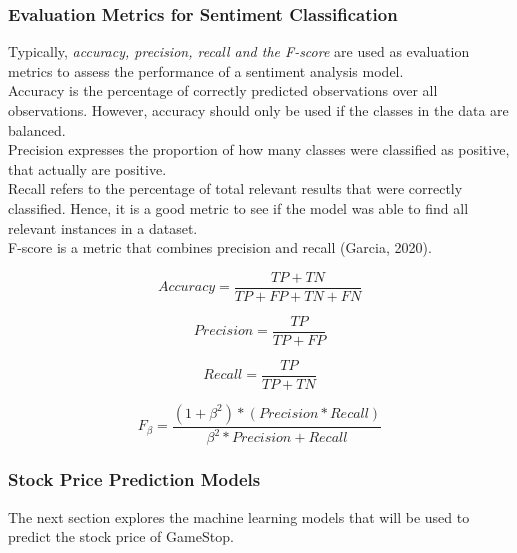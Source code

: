 \documentclass[11pt, a4paper]{article}
\begin{document}
\subsubsection{Evaluation Metrics for Sentiment Classification}
Typically, \emph{accuracy, precision, recall and the F-score} are used as evaluation metrics to assess the performance of a sentiment analysis model. \\
Accuracy is the percentage of correctly predicted observations over all observations. However, accuracy should only be used if the classes in the data are balanced.\\
Precision expresses the proportion of how many classes were classified as positive, that actually are positive.\\
Recall refers to the percentage of total relevant results that were correctly classified. Hence, it is a good metric to see if the model was able to find all relevant instances in a dataset.\\
F-score is a metric that combines precision and recall (Garcia, 2020).

\begin{equation*}
    Accuracy = \frac{TP+TN}{TP+FP+TN+FN}
\end{equation*}

\begin{equation*}
    Precision = \frac{TP}{TP+FP}
\end{equation*}

\begin{equation*}
    Recall = \frac{TP}{TP+TN}
\end{equation*}

\begin{equation*}
    F_{\beta}=\frac{(1+\beta ^{2})*(Precision * Recall)}{\beta ^{2} * Precision + Recall}
\end{equation*}

\subsubsection{Stock Price Prediction Models}
The next section explores the machine learning models that will be used to predict the stock price of GameStop. \\
\end{document}
